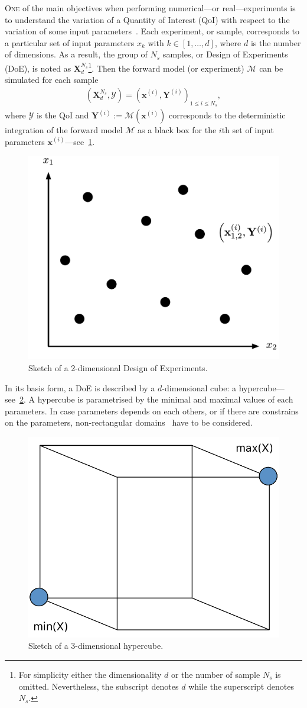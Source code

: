 \lettrine{O}{ne} of the main objectives when performing numerical---or real---experiments is to understand the variation of a Quantity of Interest (QoI) with respect to the variation of some input parameters~\citep{Sacks1989}. Each experiment, or sample, corresponds to a particular set of input parameters $x_k$ with $k \in [1, \dots , d]$, where $d$ is the number of dimensions. As a result, the group of $N_s$ samples, or Design of Experiments (DoE), is noted as $\mathbf{X}^{N_s}_d$\footnote{For simplicity either the dimensionality $d$ or the number of sample $N_s$ is omitted. Nevertheless, the subscript denotes $d$ while the superscript denotes $N_s$.}. Then the forward model (or experiment) $\mathcal{M}$ can be simulated for each sample
\begin{align}
(\mathbf{X}^{N_s}_d, \mathcal{Y})=\left(\mathbf{x}^{(i)},\mathbf{Y}^{(i)}\right)_{1\leq i\leq N_{s}},
\end{align}
\noindent where $\mathcal{Y}$ is the QoI and $\mathbf{Y}^{(i)} := \mathcal{M}(\mathbf{x}^{(i)})$ corresponds to the deterministic integration of the forward model $\mathcal{M}$ as a black box for the $i$th set of input parameters $\mathbf{x}^{(i)}$---see~\cref{fig:doe}.

\begin{figure}[!h]
\centering
\includegraphics[width=0.5\linewidth,keepaspectratio]{fig/literature/doe.pdf}
\caption{Sketch of a 2-dimensional Design of Experiments.}
\label{fig:doe}
\end{figure}

In its basis form, a DoE is described by a $d$-dimensional cube: a hypercube---see~\cref{fig:hypercube}. A hypercube is parametrised by the minimal and maximal values of each parameters. In case parameters depends on each others, or if there are constrains on the parameters, non-rectangular domains~\citep{Lekivetz2015} have to be considered.

\begin{figure}[!h]
\centering
\includegraphics[width=0.5\linewidth,keepaspectratio]{fig/literature/hypercube.pdf}
\caption{Sketch of a 3-dimensional hypercube.}
\label{fig:hypercube}
\end{figure}


